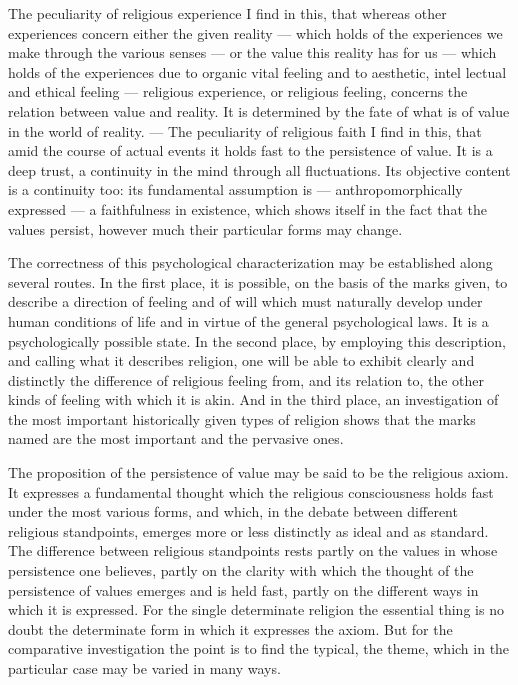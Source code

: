 \documentclass[12pt,a4paper]{article}
\newcommand{\opage}[1]{\marginnote{\footnotesize\textit{[#1]}}}
\begin{document}
The peculiarity of religious experience I find in this, that whereas other
experiences concern either the given reality --- which holds of the experiences
we make through the various senses --- or the value this reality has for us ---
which holds of the experiences due to organic vital feeling and to aesthetic,
intel\-%
\opage{417}lectual and ethical feeling --- religious experience, or religious feeling,
concerns the relation between value and reality. It is determined by the fate
of what is of value in the world of reality. --- The peculiarity of religious
faith I find in this, that amid the course of actual events it holds fast to
the persistence of value. It is a deep trust, a continuity in the mind through
all fluctuations. Its objective content is a continuity too: its fundamental
assumption is --- anthropomorphically expressed --- a faithfulness in
existence, which shows itself in the fact that the values persist, however much
their particular forms may change.

The correctness of this psychological characterization may be established along
several routes. In the first place, it is possible, on the basis of the marks
given, to describe a direction of feeling and of will which must naturally
develop under human conditions of life and in virtue of the general
psychological laws. It is a psychologically possible state. In the second
place, by employing this description, and calling what it describes religion,
one will be able to exhibit clearly and distinctly the difference of religious
feeling from, and its relation to, the other kinds of feeling with which it is
akin. And in the third place, an investigation of the most important
historically given types of religion shows that the marks named are the most
important and the pervasive ones.

The proposition of the persistence of value may be said to be the religious
axiom. It expresses a fundamental thought which the religious consciousness
holds fast under the most various forms, and which, in the debate between
different religious standpoints, emerges more or less distinctly as ideal and
as standard. The difference between religious standpoints rests partly on the
values in whose persistence one believes, partly on the clarity with which the
thought of the persistence of values emerges and is held fast, partly on the
different ways in which it is expressed. For the single determinate religion
the essential thing is no doubt the determinate form in which it expresses the
axiom. But for the \opage{418}comparative
investigation the point is to find the typical, the theme, which in the
particular case may be varied in many ways.
\end{document}
